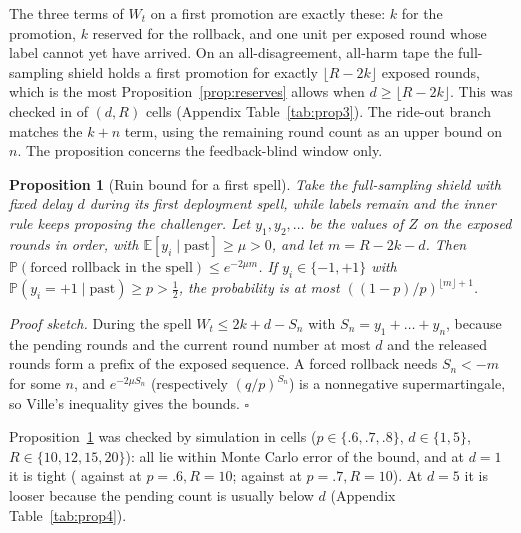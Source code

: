 \documentclass{article}
\theoremstyle{plain}
\newtheorem{proposition}{Proposition}
\theoremstyle{definition}
\newcommand{\PP}{\mathbb{P}}
\newcommand{\E}{\mathbb{E}}
\begin{document}
The three terms of $W_t$ on a first promotion are exactly these: $k$ for the promotion, $k$ reserved for the rollback, and one unit per exposed round whose label cannot yet have arrived. On an all-disagreement, all-harm tape the full-sampling shield holds a first promotion for exactly $\lfloor R-2k\rfloor$ exposed rounds, which is the most Proposition~\ref{prop:reserves} allows when $d\ge\lfloor R-2k\rfloor$. This was checked in \PThreeAttain{} of \PThreeCells{} $(d,R)$ cells (Appendix Table~\ref{tab:prop3}). The ride-out branch matches the $k+n$ term, using the remaining round count as an upper bound on $n$. The proposition concerns the feedback-blind window only.

\begin{proposition}[Ruin bound for a first spell]\label{prop:price}
Take the full-sampling shield with fixed delay $d$ during its first deployment spell, while labels remain and the inner rule keeps proposing the challenger. Let $y_1,y_2,\dots$ be the values of $Z$ on the exposed rounds in order, with $\E[y_i\mid\text{past}]\ge\mu>0$, and let $m=R-2k-d$. Then $\PP(\text{forced rollback in the spell})\le e^{-2\mu m}$. If $y_i\in\{-1,+1\}$ with $\PP(y_i=+1\mid\text{past})\ge p>\tfrac12$, the probability is at most $((1-p)/p)^{\lfloor m\rfloor+1}$.
\end{proposition}
\emph{Proof sketch.} During the spell $W_t\le2k+d-S_n$ with $S_n=y_1+\dots+y_n$, because the pending rounds and the current round number at most $d$ and the released rounds form a prefix of the exposed sequence. A forced rollback needs $S_n<-m$ for some $n$, and $e^{-2\mu S_n}$ (respectively $(q/p)^{S_n}$) is a nonnegative supermartingale, so Ville's inequality gives the bounds. \hfill$\square$

Proposition~\ref{prop:price} was checked by simulation in \PFourCells{} cells ($p\in\{.6,.7,.8\}$, $d\in\{1,5\}$, $R\in\{10,12,15,20\}$): all lie within Monte Carlo error of the bound, and at $d=1$ it is tight (\PFourTightEmp{} against \PFourTightBound{} at $p=.6,R=10$; \PFourTightEmpB{} against \PFourTightBoundB{} at $p=.7,R=10$). At $d=5$ it is looser because the pending count is usually below $d$ (Appendix Table~\ref{tab:prop4}).
\end{document}
